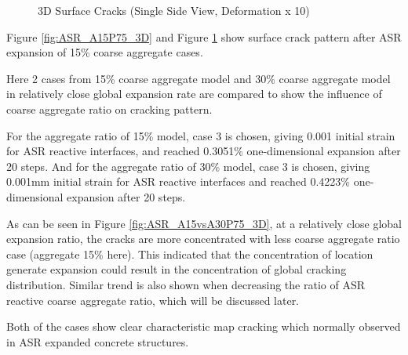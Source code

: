 \begin{figure}[!h]
  \caption{3D Surface Cracks (Single Side View, Deformation x 10)}
  \label{fig:ASR_A15P75_3DS}
\end{figure}

Figure \ref{fig:ASR_A15P75_3D} and Figure \ref{fig:ASR_A15P75_3DS} show surface crack pattern after ASR expansion of 15\% coarse aggregate cases.

Here 2 cases from 15\% coarse aggregate model and 30\% coarse aggregate model in relatively close global expansion rate are compared to show the influence of coarse aggregate ratio on cracking pattern.

For the aggregate ratio of 15\% model, case 3 is chosen, giving 0.001 initial strain for ASR reactive interfaces, and reached 0.3051\% one-dimensional expansion after 20 steps. And for the aggregate ratio of 30\% model, case 3 is chosen, giving 0.001mm initial strain for ASR reactive interfaces and reached 0.4223\% one-dimensional expansion after 20 steps.


As can be seen in Figure \ref{fig:ASR_A15vsA30P75_3D}, at a relatively close global expansion ratio, the cracks are more concentrated with less coarse aggregate ratio case (aggregate 15\% here). This indicated that the concentration of location generate expansion could result in the concentration of global cracking distribution. Similar trend is also shown when decreasing the ratio of ASR reactive coarse aggregate ratio, which will be discussed later.

Both of the cases show clear characteristic map cracking which normally observed in ASR expanded concrete structures.

